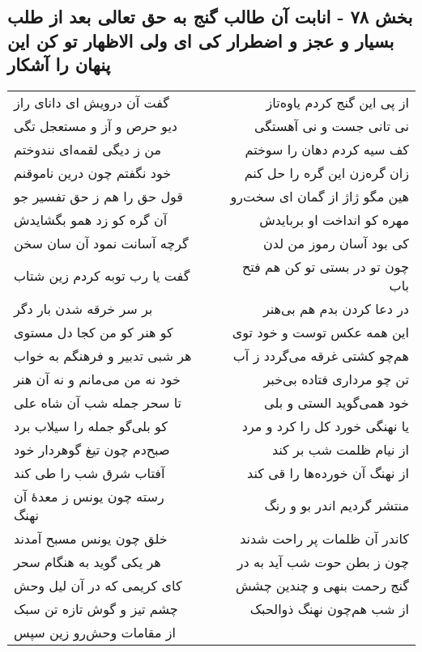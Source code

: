 \begin{center}
\section*{بخش ۷۸ - انابت آن طالب گنج به حق تعالی بعد از طلب بسیار و عجز و اضطرار کی ای ولی الاظهار تو کن این پنهان را آشکار}
\label{sec:sh078}
\begin{longtable}{l p{0.5cm} r}
گفت آن درویش ای دانای راز
&&
از پی این گنج کردم یاوه‌تاز
\\
دیو حرص و آز و مستعجل تگی
&&
نی تانی جست و نی آهستگی
\\
من ز دیگی لقمه‌ای نندوختم
&&
کف سیه کردم دهان را سوختم
\\
خود نگفتم چون درین ناموقنم
&&
زان گره‌زن این گره را حل کنم
\\
قول حق را هم ز حق تفسیر جو
&&
هین مگو ژاژ از گمان ای سخت‌رو
\\
آن گره کو زد همو بگشایدش
&&
مهره کو انداخت او بربایدش
\\
گرچه آسانت نمود آن سان سخن
&&
کی بود آسان رموز من لدن
\\
گفت یا رب توبه کردم زین شتاب
&&
چون تو در بستی تو کن هم فتح باب
\\
بر سر خرقه شدن بار دگر
&&
در دعا کردن بدم هم بی‌هنر
\\
کو هنر کو من کجا دل مستوی
&&
این همه عکس توست و خود توی
\\
هر شبی تدبیر و فرهنگم به خواب
&&
هم‌چو کشتی غرقه می‌گردد ز آب
\\
خود نه من می‌مانم و نه آن هنر
&&
تن چو مرداری فتاده بی‌خبر
\\
تا سحر جمله شب آن شاه علی
&&
خود همی‌گوید الستی و بلی
\\
کو بلی‌گو جمله را سیلاب برد
&&
یا نهنگی خورد کل را کرد و مرد
\\
صبح‌دم چون تیغ گوهردار خود
&&
از نیام ظلمت شب بر کند
\\
آفتاب شرق شب را طی کند
&&
از نهنگ آن خورده‌ها را قی کند
\\
رسته چون یونس ز معدهٔ آن نهنگ
&&
منتشر گردیم اندر بو و رنگ
\\
خلق چون یونس مسبح آمدند
&&
کاندر آن ظلمات پر راحت شدند
\\
هر یکی گوید به هنگام سحر
&&
چون ز بطن حوت شب آید به در
\\
کای کریمی که در آن لیل وحش
&&
گنج رحمت بنهی و چندین چشش
\\
چشم تیز و گوش تازه تن سبک
&&
از شب هم‌چون نهنگ ذوالحبک
\\
از مقامات وحش‌رو زین سپس
&&

\end{longtable}
\end{center}
